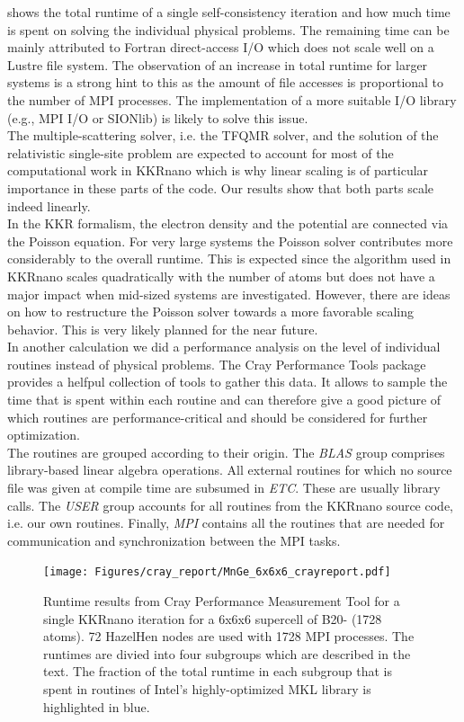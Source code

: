 \documentclass [a4paper, 12pt]{article}
\begin{document}
shows the total runtime of a single self-consistency iteration and how much time is spent
on solving the individual physical problems.
The remaining time
can be mainly attributed to Fortran direct-access I/O which does not scale well on a Lustre file system.
The observation of an increase in total runtime for larger systems is a strong hint to this as the amount of
file accesses is proportional to the number of MPI processes.
The implementation of a more suitable I/O library (e.g., MPI I/O or SIONlib) is likely to solve this issue.
\\
The multiple-scattering solver, i.e. the TFQMR solver, 
and the solution of the relativistic single-site problem are
expected to account for most of the computational work in KKRnano which 
is why linear scaling is of particular importance in these parts of the code.
Our results show that both parts scale indeed linearly.
\\
In the KKR formalism, the electron density and the potential are connected via the Poisson equation. 
For very large systems the Poisson solver contributes more considerably to the overall runtime.
This is expected since the algorithm used in KKRnano scales
quadratically with the number of atoms but does not have a major impact when mid-sized systems are investigated. 
However, there are ideas on how to restructure the Poisson solver towards a more favorable scaling behavior.
This is very likely planned for the near future.\\

In another calculation we did a performance analysis on the level of individual routines instead of
physical problems.
The Cray Performance Tools package provides a helfpul collection of tools to gather this data.
It allows to sample the time that is spent within each routine and can therefore give a good
picture of which routines are performance-critical and should be considered for further optimization.
\\
The routines are grouped according to their origin. The \textit{BLAS} group comprises
library-based linear algebra operations. 
All external routines for which no source file was given at compile time are subsumed
in \textit{ETC}. These are usually library calls.
The \textit{USER} group accounts for all routines from the KKRnano source code, i.e. our own routines.
Finally, \textit{MPI} contains all the routines that are needed for communication and synchronization
between the MPI tasks. 

\begin{figure}[h]
\begin{center}
 \texttt{[image: Figures/cray\_report/MnGe\_6x6x6\_crayreport.pdf]}
\end{center}
	\caption{Runtime results from Cray Performance Measurement Tool for a single KKRnano iteration 
	for a 6x6x6 supercell of B20- (1728 atoms). 72 HazelHen nodes are used with 1728 MPI processes.
	The runtimes are divied into four subgroups which are described in the text.
	The fraction of the total runtime in each subgroup that is spent in
	routines of Intel's highly-optimized MKL library is highlighted in blue.
	}
\label{fig:MnGe_6x6x6_crayreport}
\end{figure}
\end{document}
